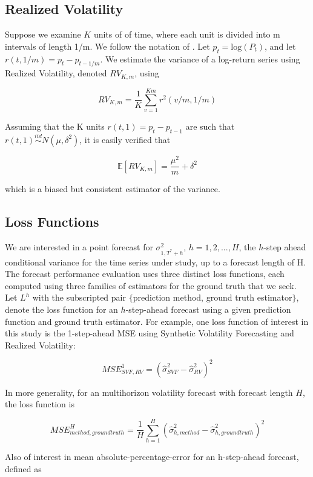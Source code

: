 \documentclass[11pt]{article}
\newcommand{\simiid}{\stackrel{iid}{\sim}} %
\def\E{\mathbb{E}} %
\theoremstyle{definition}
\begin{document}
    \subsection{Realized Volatility}
    
    Suppose we examine $K$ units of of time, where each unit is divided into m intervals of length 1/m.  We follow the notation of  \citet{andersen2009realized}. Let $p_{t} = \text{log}(P_{t})$, and let $r(t, 1/m) = p_{t} - p_{t-1/m}$.  We estimate the variance of a log-return series using Realized Volatility, denoted $RV_{K,m}$, using
    
    $$RV_{K,m} = \frac{1}{K}\sum^{Km}_{v=1}r^{2}(v/m,1/m)$$
    
    Assuming that the K units $r(t, 1) = p_{t} - p_{t-1}$ are such that $r(t, 1) \simiid N(\mu, \delta^{2})$, it is easily verified that 
    
    $$\E[RV_{K,m}] = \frac{\mu^{2}}{m} + \delta^{2}$$
    
    which is a biased but consistent estimator of the variance.

\subsection{Loss Functions}

We are interested in a point forecast for $\sigma^{2}_{1,T^{*}+h}$, $h=1,2,...,H$, the $h$-step ahead conditional variance for the time series under study, up to a forecast length of H.  The forecast performance evaluation uses three distinct loss functions, each computed using three families of estimators for the ground truth that we seek.  Let $L^{h}$ with the subscripted pair $\{$prediction method, ground truth estimator$\}$, denote the loss function for an $h$-step-ahead forecast using a given prediction function and ground truth estimator.  For example, one loss function of interest in this study is the 1-step-ahead MSE using Synthetic Volatility Forecasting and Realized Volatility:

$$ MSE^{1}_{SVF, RV} = (\hat\sigma^{2}_{SVF} - \hat\sigma^{2}_{RV})^{2}$$

In more generality, for an multihorizon volatility forecast with forecast length $H$, the loss function is 

$$ MSE^{H}_{method, ground truth} = \frac{1}{H}\sum_{h=1}^{H}(\hat\sigma^{2}_{h, method} - \hat\sigma^{2}_{h, ground truth})^{2}$$

Also of interest in mean absolute-percentage-error for an h-step-ahead forecast, defined as
\end{document}
